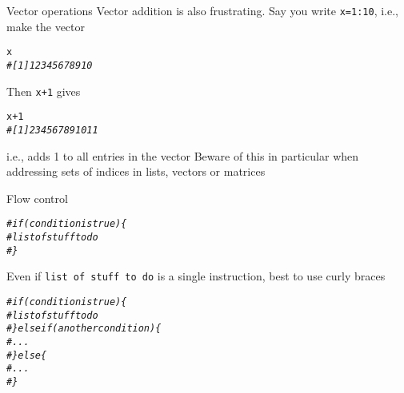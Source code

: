 \documentclass[aspectratio=169]{beamer}\usepackage[]{graphicx}\usepackage[]{xcolor}
\makeatletter
\newcommand{\hlnum}[1]{\textcolor[rgb]{0.686,0.059,0.569}{#1}}%
\newcommand{\hlcom}[1]{\textcolor[rgb]{0.678,0.584,0.686}{\textit{#1}}}%
\newcommand{\hlopt}[1]{\textcolor[rgb]{0,0,0}{#1}}%
\newcommand{\hldef}[1]{\textcolor[rgb]{0.345,0.345,0.345}{#1}}%
\newenvironment{kframe}{%
 \def\at@end@of@kframe{}%
 \ifinner\ifhmode%
  \def\at@end@of@kframe{\end{minipage}}%
  \begin{minipage}{\columnwidth}%
 \fi\fi%
 \def\FrameCommand##1{\hskip\@totalleftmargin \hskip-\fboxsep
 \colorbox{shadecolor}{##1}\hskip-\fboxsep
     \hskip-\linewidth \hskip-\@totalleftmargin \hskip\columnwidth}%
 \MakeFramed {\advance\hsize-\width
   \@totalleftmargin\z@ \linewidth\hsize
   \@setminipage}}%
 {\par\unskip\endMakeFramed%
 \at@end@of@kframe}
\newenvironment{knitrout}{}{} %
\makeatother
\begin{document}
\begin{frame}[fragile]{Vector operations}
Vector addition is also frustrating. Say you write \texttt{x=1:10}, i.e., make the vector
\begin{knitrout}
\color{fgcolor}\begin{kframe}
\begin{alltt}
\hldef{x}
\hlcom{#  [1]  1  2  3  4  5  6  7  8  9 10}
\end{alltt}
\end{kframe}
\end{knitrout}

Then \texttt{x+1} gives
\begin{knitrout}
\color{fgcolor}\begin{kframe}
\begin{alltt}
\hldef{x}\hlopt{+}\hlnum{1}
\hlcom{#  [1]  2  3  4  5  6  7  8  9 10 11}
\end{alltt}
\end{kframe}
\end{knitrout}

i.e., adds 1 to all entries in the vector
\vfill
Beware of this in particular when addressing sets of indices in lists, vectors or matrices
\end{frame}

\begin{frame}[fragile]{Flow control}
\begin{knitrout}
\color{fgcolor}\begin{kframe}
\begin{alltt}
\hlcom{# if (condition is true) \{}
\hlcom{#   list of stuff to do}
\hlcom{# \}}
\end{alltt}
\end{kframe}
\end{knitrout}

Even if \texttt{list of stuff to do} is a single instruction, best to use curly braces

\begin{knitrout}
\color{fgcolor}\begin{kframe}
\begin{alltt}
\hlcom{# if (condition is true) \{}
\hlcom{#   list of stuff to do}
\hlcom{# \} else if (another condition) \{}
\hlcom{#   ...}
\hlcom{# \} else \{}
\hlcom{#   ...}
\hlcom{# \}}
\end{alltt}
\end{kframe}
\end{knitrout}
\end{frame}
\end{document}
